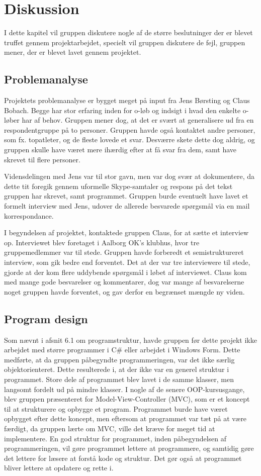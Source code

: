 \chapter{Diskussion}
I dette kapitel vil gruppen diskutere nogle af de større beslutninger der er blevet truffet gennem projektarbejdet, specielt vil gruppen diskutere de fejl, gruppen mener, der er blevet lavet gennem projektet. 
\section{Problemanalyse}
Projektets problemanalyse er bygget meget på input fra Jens Børsting og Claus Bobach. Begge har stor erfaring inden for o-løb og indsigt i hvad den enkelte o-løber har af behov. Gruppen mener dog, at det er svært at generalisere ud fra en respondentgruppe på to personer. Gruppen havde også kontaktet andre personer, som fx. topatleter, og de fleste lovede et svar. Desværre skete dette dog aldrig, og gruppen skulle have været mere ihærdig efter at få svar fra dem, samt have skrevet til flere personer. 

Vidensdelingen med Jens var til stor gavn, men var dog svær at dokumentere, da dette tit foregik gennem uformelle Skype-samtaler og respons på det tekst gruppen har skrevet, samt programmet. Gruppen burde eventuelt have lavet et formelt interview med Jens, udover de allerede besvarede spørgsmål via en mail korrespondance. 

I begyndelsen af projektet, kontaktede gruppen Claus, for at sætte et interview op. Interviewet blev foretaget i Aalborg OK’s klubhus, hvor tre gruppemedlemmer var til stede. Gruppen havde forberedt et semistruktureret interview, som gik bedre end forventet. Det at der var tre interviewere til stede, gjorde at der kom flere uddybende spørgsmål i løbet af interviewet. Claus kom med mange gode besvarelser og kommentarer, dog var mange af besvarelserne noget gruppen havde forventet, og gav derfor en begrænset mængde ny viden. 
\section{Program design}
Som nævnt i afsnit 6.1 om programstruktur, havde gruppen før dette projekt ikke arbejdet med større programmer i C\# eller arbejdet i Windows Form. Dette medførte, at da gruppen påbegyndte programmeringen, var det ikke særlig objektorienteret. Dette resulterede i, at der ikke var en generel struktur i programmet. Store dele af programmet blev lavet i de samme klasser, men langsomt fordelt ud på mindre klasser. I nogle af de senere OOP-kursusgange, blev gruppen præsenteret for Model-View-Controller (MVC), som er et koncept til at strukturere og opbygge et program. Programmet burde have været opbygget efter dette koncept, men eftersom at programmet var tæt på at være færdigt, da gruppen lærte om MVC, ville det kræve for meget tid at implementere.\newline
En god struktur for programmet, inden påbegyndelsen af programmeringen, vil gøre programmet lettere at programmere, og samtidig gøre det lettere for læsere at forstå kode og struktur. Det gør også at programmet bliver lettere at opdatere og rette i. 

